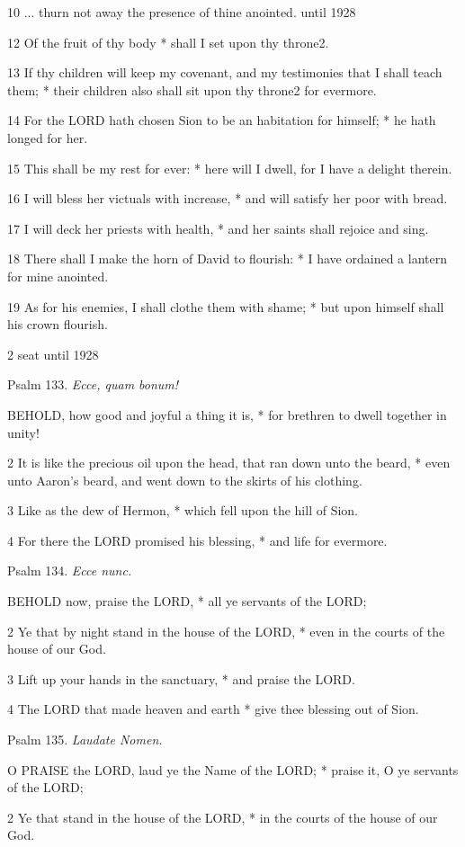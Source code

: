 10 ... thurn not away the
presence of thine anointed. until
1928

12 Of the fruit of thy body * shall I set upon thy throne2.

13 If thy children will keep my covenant, and my testimonies
that I shall teach them; * their children also shall sit upon thy throne2
for evermore.

14 For the LORD hath chosen Sion to be an habitation
for himself; * he hath longed for her.

15 This shall be my rest for ever: * here will I dwell,
for I have a delight therein.

16 I will bless her victuals with increase, * and will
satisfy her poor with bread.

17 I will deck her priests with health, * and her saints
shall rejoice and sing.

18 There shall I make the horn of David to flourish:
* I have ordained a lantern for mine anointed.

19 As for his enemies, I shall clothe them with shame;
* but upon himself shall his crown flourish.

2 seat until
1928

Psalm
133. \emph{Ecce, quam bonum!}

BEHOLD,
how good and joyful a thing it is, * for brethren to dwell together in
unity!

2 It is like the precious oil upon the head, that ran
down unto the beard, * even unto Aaron's beard, and went down to the skirts
of his clothing.

3 Like as the dew of Hermon, * which fell upon the
hill of Sion.

4 For there the LORD promised his blessing, * and life
for evermore.

Psalm
134. \emph{Ecce nunc.}

BEHOLD
now, praise the LORD, * all ye servants of the LORD;

2 Ye that by night stand in the house of the LORD,
* even in the courts of the house of our God.

3 Lift up your hands in the sanctuary, * and praise
the LORD.

4 The LORD that made heaven and earth * give thee blessing
out of Sion.

Psalm
135. \emph{Laudate Nomen.}

O
PRAISE the LORD, laud ye the Name of the LORD; * praise it, O ye servants
of the LORD;

2 Ye that stand in the house of the LORD, * in the
courts of the house of our God.

